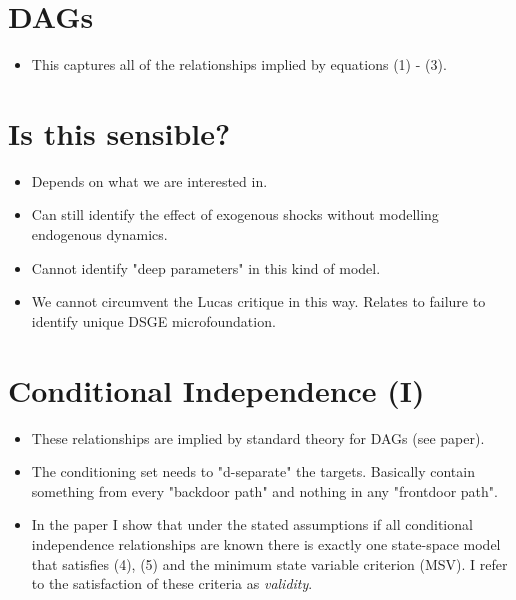 \documentclass{article}
\begin{document}
\section*{DAGs}
\begin{itemize}
    \item This captures all of the relationships implied by equations (1) - (3).
\end{itemize}

\section*{Is this sensible?}
\begin{itemize}
    \item Depends on what we are interested in.
    \item Can still identify the effect of exogenous shocks without modelling endogenous dynamics.
    \item Cannot identify "deep parameters" in this kind of model.
    \item We cannot circumvent the Lucas critique in this way. Relates to failure to identify unique DSGE microfoundation.
\end{itemize}

\section*{Conditional Independence (I)}
\begin{itemize}
    \item These relationships are implied by standard theory for DAGs (see paper).
    \item The conditioning set needs to "d-separate" the targets. Basically contain something from every "backdoor path" and nothing in any "frontdoor path". 
    \item In the paper I show that under the stated assumptions if all conditional independence relationships are known there is exactly one state-space model that satisfies (4), (5) and the minimum state variable criterion (MSV). I refer to the satisfaction of these criteria as \textit{validity}.
\end{itemize}
\end{document}
